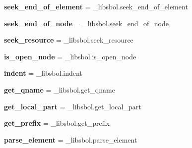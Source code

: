 \begin{DoxyCompactItemize}
\item 
{\bfseries seek\+\_\+end\+\_\+of\+\_\+element} = \+\_\+libsbol.\+seek\+\_\+end\+\_\+of\+\_\+element\hypertarget{namespacesbol_1_1libsbol_aac6926c9fa11ece1650693d4c8b9aba9}{}\label{namespacesbol_1_1libsbol_aac6926c9fa11ece1650693d4c8b9aba9}

\item 
{\bfseries seek\+\_\+end\+\_\+of\+\_\+node} = \+\_\+libsbol.\+seek\+\_\+end\+\_\+of\+\_\+node\hypertarget{namespacesbol_1_1libsbol_a2f083db1a8319279e1f33835c0db2c6f}{}\label{namespacesbol_1_1libsbol_a2f083db1a8319279e1f33835c0db2c6f}

\item 
{\bfseries seek\+\_\+resource} = \+\_\+libsbol.\+seek\+\_\+resource\hypertarget{namespacesbol_1_1libsbol_ac412a18d387ad3836eee420abac563fb}{}\label{namespacesbol_1_1libsbol_ac412a18d387ad3836eee420abac563fb}

\item 
{\bfseries is\+\_\+open\+\_\+node} = \+\_\+libsbol.\+is\+\_\+open\+\_\+node\hypertarget{namespacesbol_1_1libsbol_ae914fa5776eb1f1d502a0f0966980878}{}\label{namespacesbol_1_1libsbol_ae914fa5776eb1f1d502a0f0966980878}

\item 
{\bfseries indent} = \+\_\+libsbol.\+indent\hypertarget{namespacesbol_1_1libsbol_a485c3f2e8b7666eb2886d84227cb4ffe}{}\label{namespacesbol_1_1libsbol_a485c3f2e8b7666eb2886d84227cb4ffe}

\item 
{\bfseries get\+\_\+qname} = \+\_\+libsbol.\+get\+\_\+qname\hypertarget{namespacesbol_1_1libsbol_acd0315f65ce40b93007d86bd0d70e8a3}{}\label{namespacesbol_1_1libsbol_acd0315f65ce40b93007d86bd0d70e8a3}

\item 
{\bfseries get\+\_\+local\+\_\+part} = \+\_\+libsbol.\+get\+\_\+local\+\_\+part\hypertarget{namespacesbol_1_1libsbol_a75390c0a5dbe1c1f746fa1ad8455733b}{}\label{namespacesbol_1_1libsbol_a75390c0a5dbe1c1f746fa1ad8455733b}

\item 
{\bfseries get\+\_\+prefix} = \+\_\+libsbol.\+get\+\_\+prefix\hypertarget{namespacesbol_1_1libsbol_a04c4104390861614313b7d19dbe79f71}{}\label{namespacesbol_1_1libsbol_a04c4104390861614313b7d19dbe79f71}

\item 
{\bfseries parse\+\_\+element} = \+\_\+libsbol.\+parse\+\_\+element\hypertarget{namespacesbol_1_1libsbol_acb279fb4a14fde4cf8b51cf911d0158b}{}\label{namespacesbol_1_1libsbol_acb279fb4a14fde4cf8b51cf911d0158b}

\end{DoxyCompactItemize}


